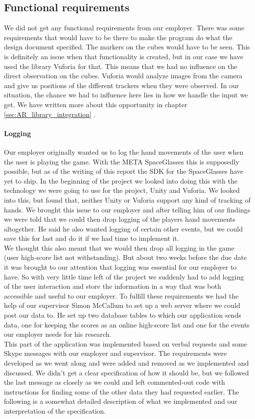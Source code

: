 \subsection{Functional requirements}
We did not get any functional requirements from our employer. There was
some requirements that would have to be there to make the program do what the
design document specified. The markers on the cubes would have to be seen. This is definitely an issue when that functionality is created, but in our case we have used the library \gls{Vuforia} for that. This means that we had no influence on the direct observation on the cubes. Vuforia would analyze images from the camera and give us positions of the different trackers when they were observed. In our situation, the chance we had to influence here lies in how we handle the input we get. We have written more about this opportunity in chapter \ref{sec:AR_library_integration} .

\paragraph{Logging}
Our employer originally wanted us to log the hand movements of the user when the user is playing the game. With the META SpaceGlasses this is supposedly possible, but as of the writing of this report the SDK for the SpaceGlasses have yet to ship. In the beginning of the project we looked into doing this with the technology we were going to use for the project, Unity and Vuforia. We looked into this, but found that, neither Unity or Vuforia support any kind of tracking of hands. We brought this issue to our employer and after telling him of our findings we were told that we could then drop logging of the players hand movements altogether. He said he also wanted logging of certain other events, but we could save this for last and do it if we had time to implement it.
\\
We thought this also meant that we would then drop all logging in the game (user high-score list not withstanding). But about two weeks before the due date it was brought to our attention that logging was essential for our employer to have. So with very little time left of the project we suddenly had to add logging of the user interaction and store the information in a way that was both accessible and useful to our employer.
To fulfill these requirements we had the help of our supervisor Simon McCallum to set up a web server where we could post our data to. He set up two database tables to which our application sends data, one for keeping the scores as an online high-score list and one for the events our employer needs for his research.\\
This part of the application was implemented based on verbal requests and some Skype messages with our employer and supervisor. The requirements were developed as we went along and were added and removed as we implemented and discussed. We didn't get a clear specification of how it should be, but we followed the last message as closely as we could and left commented-out code with instructions for finding some of the other data they had requested earlier. The following is a somewhat detailed description of what we implemented and our interpretation of the specification.
